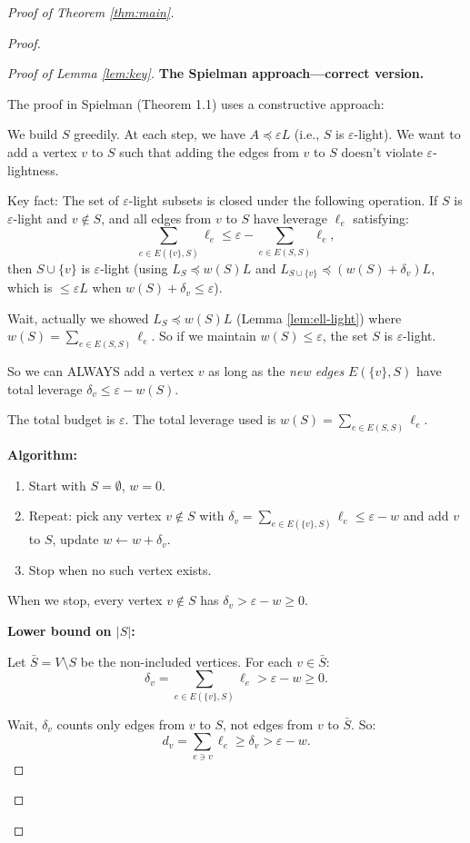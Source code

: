 \documentclass[12pt]{article}
\begin{document}
\begin{proof}[Proof of Theorem \ref{thm:main}]
\begin{proof}
\begin{proof}[Proof of Lemma \ref{lem:key}]
\textbf{The Spielman approach---correct version.}

The proof in Spielman \cite{Spielman2015} (Theorem 1.1) uses a constructive approach:

We build $S$ greedily. At each step, we have $A \preceq \varepsilon L$ (i.e., $S$ is $\varepsilon$-light). We want to add a vertex $v$ to $S$ such that adding the edges from $v$ to $S$ doesn't violate $\varepsilon$-lightness.

Key fact: The set of $\varepsilon$-light subsets is closed under the following operation. If $S$ is $\varepsilon$-light and $v \notin S$, and all edges from $v$ to $S$ have leverage $\ell_e$ satisfying:
\[
\sum_{e \in E(\{v\},S)} \ell_e \leq \varepsilon - \sum_{e \in E(S,S)} \ell_e,
\]
then $S \cup \{v\}$ is $\varepsilon$-light (using $L_S \preceq w(S) L$ and $L_{S\cup\{v\}} \preceq (w(S)+\delta_v)L$, which is $\leq \varepsilon L$ when $w(S) + \delta_v \leq \varepsilon$).

Wait, actually we showed $L_S \preceq w(S) L$ (Lemma \ref{lem:ell-light}) where $w(S) = \sum_{e \in E(S,S)} \ell_e$. So if we maintain $w(S) \leq \varepsilon$, the set $S$ is $\varepsilon$-light.

So we can ALWAYS add a vertex $v$ as long as the \emph{new edges} $E(\{v\}, S)$ have total leverage $\delta_v \leq \varepsilon - w(S)$.

The total budget is $\varepsilon$. The total leverage used is $w(S) = \sum_{e \in E(S,S)} \ell_e$.

\textbf{Algorithm:}
\begin{enumerate}
\item Start with $S = \emptyset$, $w = 0$.
\item Repeat: pick any vertex $v \notin S$ with $\delta_v = \sum_{e \in E(\{v\},S)} \ell_e \leq \varepsilon - w$ and add $v$ to $S$, update $w \leftarrow w + \delta_v$.
\item Stop when no such vertex exists.
\end{enumerate}

When we stop, every vertex $v \notin S$ has $\delta_v > \varepsilon - w \geq 0$.

\textbf{Lower bound on $|S|$:}

Let $\bar{S} = V \setminus S$ be the non-included vertices. For each $v \in \bar{S}$:
\[
\delta_v = \sum_{e \in E(\{v\}, S)} \ell_e > \varepsilon - w \geq 0.
\]

Wait, $\delta_v$ counts only edges from $v$ to $S$, not edges from $v$ to $\bar{S}$. So:
\[
d_v = \sum_{e \ni v} \ell_e \geq \delta_v > \varepsilon - w.
\]


\end{proof}
\end{proof}
\end{proof}
\end{document}
